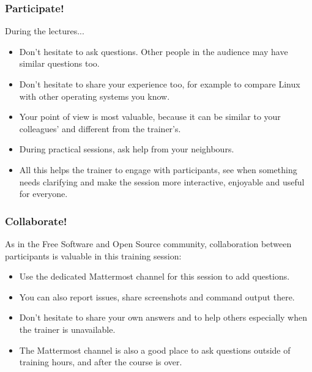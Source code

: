 \begin{frame}

\frametitle{Participate!}
During the lectures...
\begin{itemize}
\item Don't hesitate to ask questions. Other people in the audience may have
similar questions too.
\item Don't hesitate to share your experience too, for example to compare Linux
with other operating systems you know.
\item Your point of view is most valuable, because it can be similar to your
colleagues' and different from the trainer's.
\item During practical sessions, ask help from your neighbours.
\item All this helps the trainer to engage with participants, see when
something needs clarifying and make the session more interactive, enjoyable
and useful for everyone.
\end{itemize}
\end{frame}

\begin{frame}
\frametitle{Collaborate!}
  As in the Free Software and Open Source community,
  collaboration between participants is valuable in this training session:
  \begin{itemize}
    \item Use the dedicated Mattermost channel for this session
          to add questions.
    \item You can also report issues, share screenshots and command output there.
    \item Don't hesitate to share your own answers and to help others
          especially when the trainer is unavailable.
    \item The Mattermost channel is also a good place to ask questions
          outside of training hours, and after the course is over.
    \end{itemize}
\end{frame}
